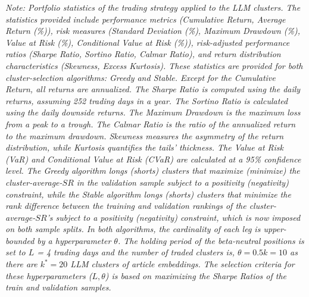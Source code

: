 \begin{table}[H]
\vspace{0.5cm}
\begin{minipage}{\textwidth}
\setlength{\parindent}{0pt}
{\footnotesize\textit{Note:
Portfolio statistics of the trading strategy applied to the LLM clusters.
The statistics provided include performance metrics (Cumulative Return, Average Return (\%)), risk measures (Standard Deviation (\%), Maximum Drawdown (\%), Value at Risk (\%), Conditional Value at Risk (\%)), risk-adjusted performance ratios (Sharpe Ratio, Sortino Ratio, Calmar Ratio), and return distribution characteristics (Skewness, Excess Kurtosis). These statistics are provided for both cluster-selection algorithms: Greedy and Stable.
Except for the Cumulative Return, all returns are annualized. The Sharpe Ratio is computed using the daily returns, assuming 252 trading days in a year. The Sortino Ratio is calculated using the daily downside returns. The Maximum Drawdown is the maximum loss from a peak to a trough. The Calmar Ratio is the ratio of the annualized return to the maximum drawdown. Skewness measures the asymmetry of the return distribution, while Kurtosis quantifies the tails' thickness. The Value at Risk (VaR) and Conditional Value at Risk (CVaR) are calculated at a 95\% confidence level.
The Greedy algorithm longs (shorts) clusters that maximize (minimize) the cluster-average-$SR$ in the validation sample subject to a positivity (negativity) constraint, while the Stable algorithm longs (shorts) clusters that minimize the rank difference between the training and validation rankings of the cluster-average-$SR$'s subject to a positivity (negativity) constraint, which is now imposed on both sample splits. In both algorithms, the cardinality of each leg is upper-bounded by a hyperparameter $\theta$.
The holding period of the beta-neutral positions is set to $L$ = 4 trading days and the number of traded clusters is, $\theta = 0.5k=10$ as there are $k^*=20$ LLM clusters of article embeddings. The selection criteria for these hyperparameters ($L,\theta$) is based on maximizing the Sharpe Ratios of the train and validation samples.
}}
\end{minipage}
\end{table}
